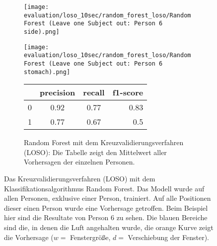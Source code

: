 \begin{figure}[ht]
\begin{subfigure}{1\textwidth}
    \end{subfigure}
    \begin{subfigure}{1\textwidth}
      \texttt{[image: evaluation/loso\_10sec/random\_forest\_loso/Random Forest (Leave one Subject out: Person 6 side).png]}
    \end{subfigure}
    \begin{subfigure}{1\textwidth}
      \texttt{[image: evaluation/loso\_10sec/random\_forest\_loso/Random Forest (Leave one Subject out: Person 6 stomach).png]}
  \end{subfigure}

  \begin{subfigure}{1\textwidth}
      \begin{center}
          \begin{tabular}{ | l | c | c | r | }
            \hline
             & precision & recall & f1-score\\ \hline
            0 & 0.92 & 0.77 & 0.83\\ \hline
            1 & 0.77 & 0.67 & 0.5\\
            \hline
          \end{tabular}
      \end{center}
      \caption{Random Forest mit dem Kreuzvalidierungsverfahren (LOSO): Die Tabelle zeigt den Mittelwert aller Vorhersagen der einzelnen Personen.}
      \label{implementation:app:screenshots:user_studies_information}
  \end{subfigure}
    \caption{Das Kreuzvalidierungsverfahren (LOSO) mit dem Klassifikationsalgorithmus Random Forest. Das Modell wurde auf allen Personen, exklusive einer Person, trainiert. Auf alle Positionen dieser einen Person wurde eine Vorhersage getroffen. Beim Beispiel hier sind die Resultate von Person 6 zu sehen. Die blauen Bereiche sind die, in denen die Luft angehalten wurde, die orange Kurve zeigt die Vorhersage ($w=$ Fenstergröße, $d=$ Verschiebung der Fenster).}
\label{evaluation:random_forest_loso:person6}
\end{figure}


